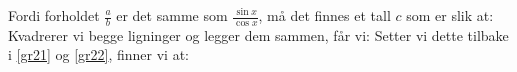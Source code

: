 Fordi forholdet $ \frac{a}{b}$ er det samme som $ \frac{\sin x}{\cos x} $, må det finnes et tall $ c $ som er slik at:
Kvadrerer vi begge ligninger og legger dem sammen, får vi:
Setter vi dette tilbake i \eqref{gr21} og \eqref{gr22}, finner vi at:
